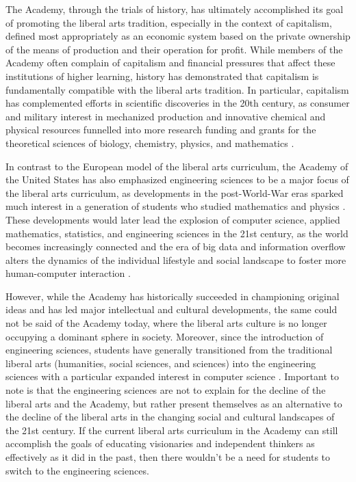 \documentclass[12pt,letterpaper]{article}
\begin{document}
The Academy, through the trials of history, has ultimately accomplished its goal of promoting the liberal arts tradition, especially in the context of capitalism, defined most appropriately as an economic system based on the private ownership of the means of production and their operation for profit.  While members of the Academy often complain of capitalism and financial pressures that affect these institutions of higher learning, history has demonstrated that capitalism is fundamentally compatible with the liberal arts tradition.  In particular, capitalism has complemented efforts in scientific discoveries in the 20th century, as consumer and military interest in mechanized production and innovative chemical and physical resources funnelled into more research funding and grants for the theoretical sciences of biology, chemistry, physics, and mathematics \cite{accounts_engineering_nodate}.  

In contrast to the European model of the liberal arts curriculum, the Academy of the United States has also emphasized engineering sciences to be a major focus of the liberal arts curriculum, as developments in the post-World-War eras sparked much interest in a generation of students who studied mathematics and physics \cite{noauthor_history_nodate}.  These developments would later lead the explosion of computer science, applied mathematics, statistics, and engineering sciences in the 21st century, as the world becomes increasingly connected and the era of big data and information overflow alters the dynamics of the individual lifestyle and social landscape to foster more human-computer interaction \cite{paula_mcavoy_relationship_2019}.  

However, while the Academy has historically succeeded in championing original ideas and has led major intellectual and cultural developments, the same could not be said of the Academy today, where the liberal arts culture is no longer occupying a dominant sphere in society.  Moreover, since the introduction of engineering sciences, students have generally transitioned from the traditional liberal arts (humanities, social sciences, and sciences) into the engineering sciences with a particular expanded interest in computer science \cite{marketer_top_nodate}.  Important to note is that the engineering sciences are not to explain for the decline of the liberal arts and the Academy, but rather present themselves as an alternative to the decline of  the liberal arts in the changing social and cultural landscapes of the 21st century.  If the current liberal arts curriculum in the Academy can still accomplish the goals of educating visionaries and independent thinkers as effectively as it did in the past, then there wouldn't be a need for students to switch to the engineering sciences.
\end{document}
